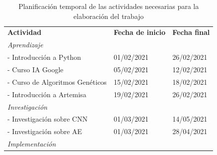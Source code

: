 \begin{table}[!h]
\caption{Planificación temporal de las actividades necesarias para la elaboración del trabajo}
\label{tab:tiempos_planificacion}
\centering
\begin{tabular}{lll}
\toprule
\multicolumn{1}{l|}{\multirow{2}{*}{\textbf{Actividad}}}           & \multicolumn{1}{l|}{\multirow{2}{*}{\textbf{Fecha de inicio}}} & \multirow{2}{*}{\textbf{Fecha final}} \\
\multicolumn{1}{l|}{}                                              & \multicolumn{1}{l|}{}                                         &                                       \\ \hline
\multicolumn{3}{l}{\textit{Aprendizaje}}                                                                                                                                            \\ \hline
\multicolumn{1}{l|}{- Introducción a Python}                       & \multicolumn{1}{l|}{01/02/2021}                               & 26/02/2021                            \\
\multicolumn{1}{l|}{- Curso IA Google}                             & \multicolumn{1}{l|}{05/02/2021}                               & 12/02/2021                            \\
\multicolumn{1}{l|}{- Curso de Algoritmos Genéticos}               & \multicolumn{1}{l|}{15/02/2021}                               & 18/02/2021                            \\
\multicolumn{1}{l|}{- Introducción a Artemisa} & \multicolumn{1}{l|}{19/02/2021}                               & 26/02/2021                            \\ \hline
\multicolumn{3}{l}{\textit{Investigación}}                                                                                                                                          \\ \hline
\multicolumn{1}{l|}{- Investigación sobre CNN}                     & \multicolumn{1}{l|}{01/03/2021}                               & 14/05/2021                            \\
\multicolumn{1}{l|}{- Investigación sobre AE}                      & \multicolumn{1}{l|}{01/03/2021}                               & 28/04/2021                            \\ \hline
\multicolumn{3}{l}{\textit{Implementación}}                                                                                                                                         \\ \hline

\end{tabular}
\end{table}
